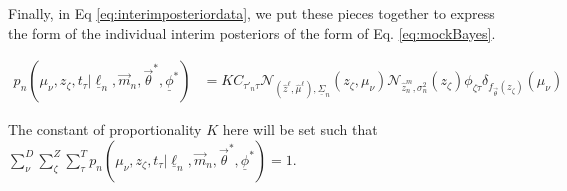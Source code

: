 \documentclass[12pt, onecolumn]{emulateapj}
\newcommand{\textul}{\underline}
\begin{document}
Finally, in Eq \ref{eq:interimposteriordata}, we put these pieces together to express the form of the individual interim posteriors of the form of Eq. \ref{eq:mockBayes}.

\begin{align}
\label{eq:interimposteriordata}
p_{n}(\mu_{\nu}, z_{\zeta}, t_{\tau} | \textul{\ell}_{n}, \vec{m}_{n}, \vec{\theta}^{*}, \textul{\phi}^{*}) &= KC_{\tau'_{n}\tau}\mathcal{N}_{(\hat{z}^{\ell}, \hat{\mu}^{\ell}), \textul{\Sigma}_{n}}(z_{\zeta}, \mu_{\nu}) \mathcal{N}_{\hat{z}_{n}^{m}, \sigma_{n}^{2}}(z_{\zeta}) \phi_{\zeta\tau}\delta_{f_{\vec{\theta}}(z_{\zeta})}(\mu_{\nu})
\end{align}

The constant of proportionality $K$ here will be set such that $\sum_{\nu}^{D}\sum_{\zeta}^{Z}\sum_{\tau}^{T} p_{n}(\mu_{\nu}, z_{\zeta}, t_{\tau} | \textul{\ell}_{n}, \vec{m}_{n}, \vec{\theta}^{*}, \textul{\phi}^{*})=1$.
\end{document}
